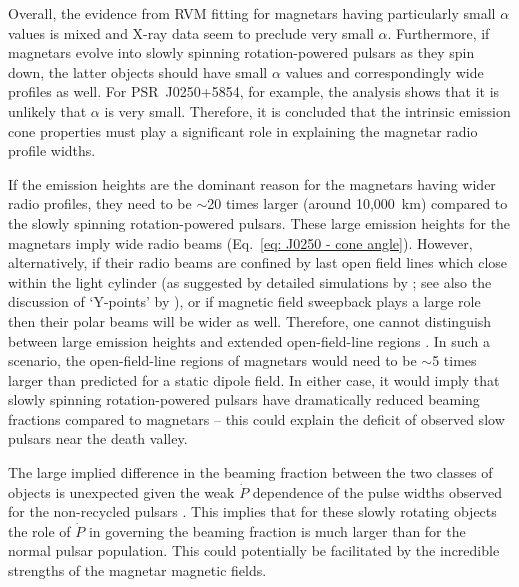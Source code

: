 Overall, the evidence from RVM fitting for magnetars having particularly small $\alpha$ values is mixed and X-ray data seem to preclude very small $\alpha$. Furthermore, if magnetars evolve into slowly spinning rotation-powered pulsars as they spin down, the latter objects should have small $\alpha$ values and correspondingly wide profiles as well. For PSR~J0250+5854, for example, the analysis shows that it is unlikely that $\alpha$ is very small. Therefore, it is concluded that the intrinsic emission cone properties must play a significant role in explaining the magnetar radio profile widths.




If the emission heights are the dominant reason for the magnetars having wider radio profiles, they need to be $\sim$20 times larger (around 10,000~km) compared to the slowly spinning rotation-powered pulsars. These large emission heights for the magnetars imply wide radio beams (Eq.~\ref{eq: J0250 - cone angle}). However, alternatively, if their radio beams are confined by last open field lines which close within the light cylinder (as suggested by detailed simulations by \citealt{Sxxx2006}; see also the discussion of `Y-points' by \citealt{Cxxx2014}), or if magnetic field sweepback plays a large role \citep[e.g.][]{CRxx2012} then their polar beams will be wider as well. Therefore, one cannot distinguish between large emission heights and extended open-field-line regions \citep[e.g.][]{RWJx2015b, RWJx2015a}. In such a scenario, the open-field-line regions of magnetars would need to be $\sim$5 times larger than predicted for a static dipole field. In either case, it would imply that slowly spinning rotation-powered pulsars have dramatically reduced beaming fractions compared to magnetars -- this could explain the deficit of observed slow pulsars near the death valley.

The large implied difference in the beaming fraction between the two classes of objects is unexpected given the weak $\dot{P}$ dependence of the pulse widths observed for the non-recycled pulsars \citep[e.g.][]{KGxx2003, JKxx2019}. This implies that for these slowly rotating objects the role of $\dot{P}$ in governing the beaming fraction is much larger than for the normal pulsar population. This could potentially be facilitated by the incredible strengths of the magnetar magnetic fields.

















